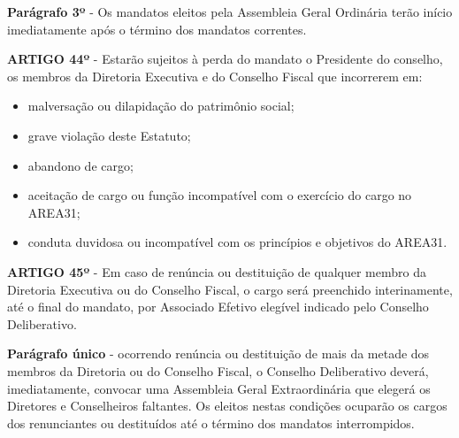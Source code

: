 \bigskip

\textbf{Parágrafo 3º} - Os mandatos eleitos pela Assembleia Geral Ordinária 
terão início imediatamente após o término dos mandatos correntes.

\bigskip

\textbf{ARTIGO 44º} - Estarão sujeitos à perda do mandato o Presidente do 
conselho, os membros da Diretoria Executiva e do Conselho Fiscal que 
incorrerem em:

\begin{itemize}
    \item malversação ou dilapidação do patrimônio social; 
    \item grave violação deste Estatuto; 
    \item abandono de cargo; 
    \item aceitação de cargo ou função incompatível com o exercício do cargo no AREA31; 
    \item conduta duvidosa ou incompatível com os princípios e objetivos do AREA31.
\end{itemize}

\textbf{ARTIGO 45º} - Em caso de renúncia ou destituição de qualquer membro 
da Diretoria Executiva ou do Conselho Fiscal, o cargo será preenchido 
interinamente, até o final do mandato, por Associado Efetivo elegível 
indicado pelo Conselho Deliberativo.

\bigskip

\textbf{Parágrafo único} - ocorrendo renúncia ou destituição de mais da 
metade dos membros da Diretoria ou do Conselho Fiscal, o Conselho 
Deliberativo deverá, imediatamente, convocar uma Assembleia Geral 
Extraordinária que elegerá os Diretores e Conselheiros faltantes. 
Os eleitos nestas condições ocuparão os cargos dos renunciantes ou 
destituídos até o término dos mandatos interrompidos.
